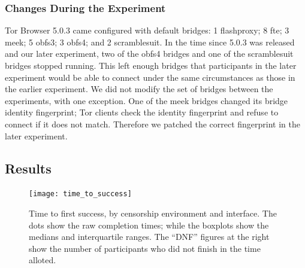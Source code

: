 \documentclass[USenglish,oneside,twocolumn]{article}
\begin{document}
\subsubsection{Changes During the Experiment} 

Tor Browser 5.0.3 came configured with default bridges:
1 flashproxy;
8 fte;
3 meek;
5 obfs3;
3 obfs4;
and 2 scramblesuit.
In the time since 5.0.3 was released and our later experiment,
two of the obfs4 bridges and one of the scramblesuit bridges stopped running.
This left enough bridges that participants in the later experiment would be able to connect
under the same circumstances as those in the earlier experiment.
We did not modify the set of bridges between the experiments,
with one exception.
One of the meek bridges changed its bridge identity fingerprint;
Tor clients check the identity fingerprint and refuse to connect
if it does not match.
Therefore we patched the correct fingerprint in the later experiment.

\subsection{Results} 

\begin{figure}
\centering
\texttt{[image: time\_to\_success]}
\caption{
Time to first success, by censorship environment and interface.
The dots show the raw completion times;
while the boxplots show the medians and interquartile ranges.
The ``DNF'' figures at the right
show the number of participants who did not finish
in the time alloted.
}
\label{fig:time_to_success}
\end{figure}
\end{document}
